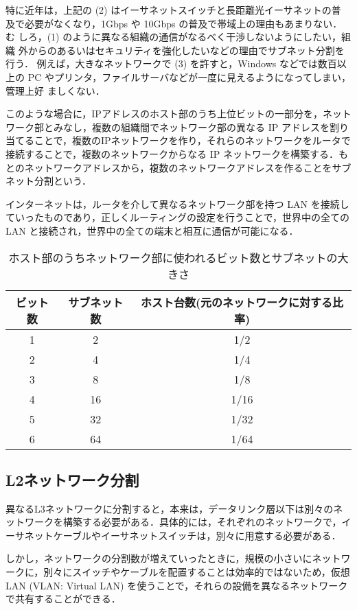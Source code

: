 特に近年は，上記の (2) はイーサネットスイッチと長距離光イーサネットの普
及で必要がなくなり，1Gbps や 10Gbps の普及で帯域上の理由もあまりない．む
しろ，(1) のように異なる組織の通信がなるべく干渉しないようにしたい，組織
外からのあるいはセキュリティを強化したいなどの理由でサブネット分割を行う．
例えば，大きなネットワークで (3) を許すと，Windows などでは数百以上の PC 
やプリンタ，ファイルサーバなどが一度に見えるようになってしまい，管理上好
ましくない．

このような場合に，IPアドレスのホスト部のうち上位ビットの一部分を，ネット
ワーク部とみなし，複数の組織間でネットワーク部の異なる IP アドレスを割り
当てることで，複数のIPネットワークを作り，それらのネットワークをルータで
接続することで，複数のネットワークからなる IP ネットワークを構築する．も
とのネットワークアドレスから，複数のネットワークアドレスを作ることをサブ
ネット分割という．

インターネットは，ルータを介して異なるネットワーク部を持つ LAN を接続し
ていったものであり，正しくルーティングの設定を行うことで，世界中の全ての
LAN と接続され，世界中の全ての端末と相互に通信が可能になる．

\begin{table}[tb]
  \centering
  \caption{ホスト部のうちネットワーク部に使われるビット数とサブネットの大きさ}
  \begin{tabular}{c|c|c}
    \hline
   ビット数 & サブネット数 & ホスト台数(元のネットワークに対する比率)\\
    \hline
   1 & 2 & 1/2 \\
    \hline
   2 & 4 & 1/4 \\
    \hline
   3 & 8 & 1/8 \\
    \hline
   4 & 16 & 1/16 \\
    \hline
   5 & 32 & 1/32 \\
    \hline
   6 & 64 & 1/64 \\
    \hline
  \end{tabular}
\end{table}


\subsection{L2ネットワーク分割}

異なるL3ネットワークに分割すると，本来は，データリンク層以下は別々のネットワークを構築する必要がある．具体的には，それぞれのネットワークで，イーサネットケーブルやイーサネットスイッチは，別々に用意する必要がある．

しかし，ネットワークの分割数が増えていったときに，規模の小さいにネットワークに，別々にスイッチやケーブルを配置することは効率的ではないため，仮想LAN (VLAN: Virtual LAN) を使うことで，それらの設備を異なるネットワークで共有することができる．


